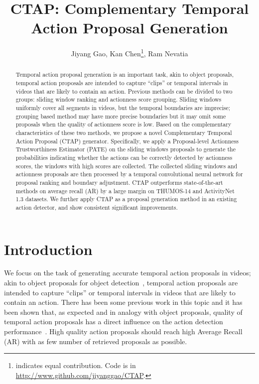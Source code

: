 \documentclass[runningheads]{llncs}
\begin{document}
\title{CTAP: Complementary Temporal Action Proposal Generation} 


\author{Jiyang Gao,
Kan Chen\thanks{indicates equal contribution. Code is in {\url{http://www.github.com/jiyanggao/CTAP}}.},
Ram Nevatia}


\maketitle              \begin{abstract}
Temporal action proposal generation is an important task, akin to object proposals, temporal action proposals are intended to capture ``clips'' or temporal intervals in videos that are likely to contain an action. Previous methods can be divided to two groups: sliding window ranking and actionness score grouping. Sliding windows uniformly cover all segments in videos, but the temporal boundaries are imprecise; grouping based method may have more precise boundaries but it may omit some proposals when the quality of actionness score is low. Based on the complementary characteristics of these two methods, we propose a novel Complementary Temporal Action Proposal (CTAP) generator. Specifically, we apply a Proposal-level Actionness Trustworthiness Estimator (PATE) on the sliding windows proposals to generate the probabilities indicating whether the actions can be correctly detected by actionness scores, the windows with high scores are collected. The collected sliding windows and actionness proposals are then processed by a temporal convolutional neural network for proposal ranking and boundary adjustment. CTAP outperforms state-of-the-art methods on average recall (AR) by a large margin on THUMOS-14 and ActivityNet 1.3 datasets. We further apply CTAP as a proposal generation method in an existing action detector, and show consistent significant improvements. 
\end{abstract}


\section{Introduction}\label{sec: intro}

We focus on the task of generating accurate temporal action proposals in videos; akin to object proposals for object detection~\cite{ren2015faster}, temporal action proposals are intended to capture ``clips'' or temporal intervals in videos that are likely to contain an action. There has been some previous work in this topic and it has been shown that, as expected and in analogy with object proposals, quality of temporal action proposals has a direct influence on the action detection performance~\cite{Gao_2017_ICCV,Shou_2016_CVPR}. High quality action proposals should reach high Average Recall (AR) with as few number of retrieved proposals as possible. 
\end{document}

